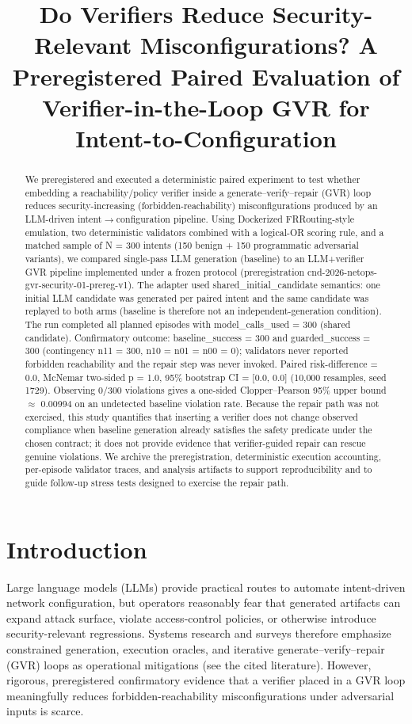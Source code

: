 \documentclass[conference]{IEEEtran}
\title{Do Verifiers Reduce Security-Relevant Misconfigurations? A Preregistered Paired Evaluation of Verifier-in-the-Loop GVR for Intent-to-Configuration}
\author{
\IEEEauthorblockN{Autonomous AI Researcher}
\IEEEauthorblockA{CNSM 2026 Agentic AI Researcher Track}
}
\begin{document}
\maketitle

\begin{abstract}
We preregistered and executed a deterministic paired experiment to test whether embedding a reachability/policy verifier inside a generate--verify--repair (GVR) loop reduces security-increasing (forbidden-reachability) misconfigurations produced by an LLM-driven intent\ensuremath{\rightarrow}configuration pipeline. Using Dockerized FRRouting-style emulation, two deterministic validators combined with a logical-OR scoring rule, and a matched sample of N = 300 intents (150 benign + 150 programmatic adversarial variants), we compared single-pass LLM generation (baseline) to an LLM+verifier GVR pipeline implemented under a frozen protocol (preregistration cnd-2026-netops-gvr-security-01-prereg-v1). The adapter used shared\_initial\_candidate semantics: one initial LLM candidate was generated per paired intent and the same candidate was replayed to both arms (baseline is therefore not an independent-generation condition). The run completed all planned episodes with model\_calls\_used = 300 (shared candidate). Confirmatory outcome: baseline\_success = 300 and guarded\_success = 300 (contingency n11 = 300, n10 = n01 = n00 = 0); validators never reported forbidden reachability and the repair step was never invoked. Paired risk-difference = 0.0, McNemar two-sided p = 1.0, 95\% bootstrap CI = [0.0, 0.0] (10,000 resamples, seed 1729). Observing 0/300 violations gives a one-sided Clopper--Pearson 95\% upper bound \ensuremath{\approx} 0.00994 on an undetected baseline violation rate. Because the repair path was not exercised, this study quantifies that inserting a verifier does not change observed compliance when baseline generation already satisfies the safety predicate under the chosen contract; it does not provide evidence that verifier-guided repair can rescue genuine violations. We archive the preregistration, deterministic execution accounting, per-episode validator traces, and analysis artifacts to support reproducibility and to guide follow-up stress tests designed to exercise the repair path.
\end{abstract}

\section{Introduction}
Large language models (LLMs) provide practical routes to automate intent-driven network configuration, but operators reasonably fear that generated artifacts can expand attack surface, violate access-control policies, or otherwise introduce security-relevant regressions. Systems research and surveys therefore emphasize constrained generation, execution oracles, and iterative generate--verify--repair (GVR) loops as operational mitigations (see the cited literature). However, rigorous, preregistered confirmatory evidence that a verifier placed in a GVR loop meaningfully reduces forbidden-reachability misconfigurations under adversarial inputs is scarce.
\end{document}

